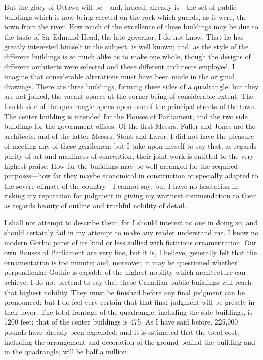 But the glory of Ottawa will be---and, indeed, already is---the set
of public buildings which is now being erected on the rock which
guards, as it were, the town from the river.  How much of the
excellence of these buildings may be due to the taste of Sir Edmund
Head, the late governor, I do not know.  That he has greatly
interested himself in the subject, is well known; and, as the style
of the different buildings is so much alike as to make one whole,
though the designs of different architects were selected and these
different architects employed, I imagine that considerable
alterations must have been made in the original drawings.  There
are three buildings, forming three sides of a quadrangle; but they
are not joined, the vacant spaces at the corner being of
considerable extent.  The fourth side of the quadrangle opens upon
one of the principal streets of the town.  The center building is
intended for the Houses of Parliament, and the two side buildings
for the government offices.  Of the first Messrs. Fuller and Jones
are the architects, and of the latter Messrs. Stent and Laver.  I
did not have the pleasure of meeting any of these gentlemen; but I
take upon myself to say that, as regards purity of art and
manliness of conception, their joint work is entitled to the very
highest praise.  How far the buildings may be well arranged for the
required purposes---how far they maybe economical in construction or
specially adapted to the severe climate of the country---I cannot
say; but I have no hesitation in risking my reputation for judgment
in giving my warmest commendation to them as regards beauty of
outline and truthful nobility of detail.

I shall not attempt to describe them, for I should interest no one
in doing so, and should certainly fail in my attempt to make any
reader understand me.  I know no modern Gothic purer of its kind or
less sullied with fictitious ornamentation.  Our own Houses of
Parliament are very fine, but it is, I believe, generally felt that
the ornamentation is too minute; and, moreover, it may be
questioned whether perpendicular Gothic is capable of the highest
nobility which architecture can achieve.  I do not pretend to say
that these Canadian public buildings will reach that highest
nobility.  They must be finished before any final judgment can be
pronounced; but I do feel very certain that that final judgment
will be greatly in their favor.  The total frontage of the
quadrangle, including the side buildings, is 1200 feet; that of the
center buildings is 475.  As I have said before, 225,000 pounds
have already been expended; and it is estimated that the total
cost, including the arrangement and decoration of the ground behind
the building and in the quadrangle, will be half a million.

